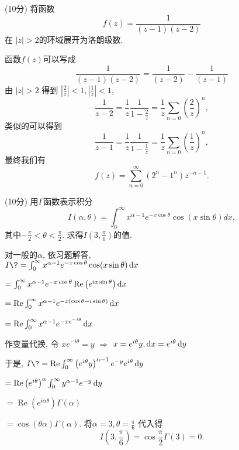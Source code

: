 \documentclass{njustexam}
\begin{document}
    \begin{problem}{(10分)}
        将函数$$f(z) = \frac{1}{(z-1)(z-2)}$$ 
        在 $|z|>2$的环域展开为洛朗级数. 
        \end{problem}
        \vfill
        \begin{solution}
        函数$f(z)$可以写成
        $$
        \frac{1}{(z-1)(z-2)}=\frac{1}{(z-2)}-\frac{1}{(z-1)} 
        $$
        由 $|z|>2$ 得到 $\left|\frac{2}{z}\right|<1, \left|\frac{1}{z}\right|<1$,  
        $$
        \frac{1}{z-2} = \frac{1}{z} \frac{1}{1-\frac{2}{z}} = \frac{1}{z} \sum_{n=0} \left(\frac{2}{z}\right)^n,  
        $$
        类似的可以得到 
        $$\frac{1}{z-1} = \frac{1}{z} \frac{1}{1-\frac{1}{z}} = \frac{1}{z} \sum_{n=0} \left(\frac{1}{z}\right)^n,  
        $$
        最终我们有 
        $$f(z) = \sum_{n=0}^{\infty}\left(2^n-1^n\right) z^{-n-1}.  $$
        \end{solution}


        \begin{problem}{(10分)}
            用$\Gamma$函数表示积分
            $$
            I(\alpha, \theta) = \int_0^\infty x^{ \alpha - 1}  e^{-x \cos{\theta}} \cos\left( x \sin{\theta} \right) dx, 
            $$
            其中$ -\frac{\pi}{2} < \theta < \frac{\pi}{2}$. 
            求得$I(3, \frac{\pi}{6})$的值.
            \end{problem}  
            \vfill
            \begin{solution}
            对一般的$\alpha$, 依习题解答,\\
            $I\?=\int_0^{\infty} x^{\alpha-1} e^{-x \cos \theta} \cos (x \sin \theta) \dx$ \par
            \+ $=\int_0^{\infty} x^{\alpha-1} e^{-x \cos \theta} \operatorname{Re}\left(e^{i x \sin \theta}\right) \mathop{}\!\mathrm{d} x $ \par
            \+ $=\operatorname{Re} \int_0^{\infty} x^{\alpha-1} e^{-x(\cos \theta-i \sin \theta)} \mathop{}\!\mathrm{d} x$ \par
            \+ $=\operatorname{Re} \int_0^{\infty} x^{\alpha-1} e^{-x e^{-i \theta}} \mathop{}\!\mathrm{d} x$ \par
            作变量代换, 令 $x e^{-i \theta}=y$ $\Rightarrow$ $x=e^{i \theta} y,  \mathop{}\!\mathrm{d} x=e^{i \theta} \mathop{}\!\mathrm{d} y$ \par
            于是,  $I \?=\operatorname{Re} \int_0^{\infty}\left(e^{i \theta} y\right)^{\alpha-1} e^{-y} e^{i \theta} \dy $ \par
            \+ $ =\operatorname{Re}\left(e^{i \theta}\right)^\alpha \int_0^{\infty} y^{\alpha-1} e^{-y} \mathop{}\!\mathrm{d} y $ \par
            \+ $ =\operatorname{Re}\left(e^{i \alpha \theta}\right) \Gamma(\alpha)$ \par
            \+ $ = \cos {(\theta \alpha)} \Gamma(\alpha).  $ 
            将$\alpha = 3, \theta = \frac{\pi}{6} $ 代入得
            $$I(3, \frac{\pi}{6})=  \cos{ \frac{\pi}{2}}  \Gamma(3) = 0. $$
            \end{solution}
\end{document}
